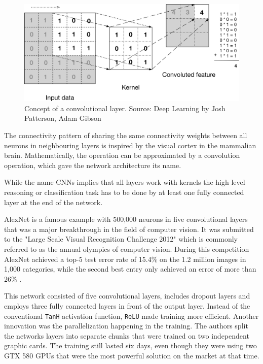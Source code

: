 \begin{figure}[h]
    \centering
	\includegraphics[width=.8\textwidth]{./images/illustrations/cnn}
    \caption{Concept of a convolutional layer. Source: Deep Learning by Josh Patterson, Adam Gibson}
    \label{fig:cnn}
\end{figure}





The connectivity pattern of sharing the same connectivity weights between all neurons in neighbouring layers is inspired by the visual cortex in the mammalian brain.
Mathematically, the operation can be approximated by a convolution operation, which gave the network architecture its name. 

While the name CNNs implies that all layers work with kernels the high level reasoning or classification task has to be done by at least one fully connected layer at the end of the network.

AlexNet is a famous example with 500,000 neurons in five convolutional layers \cite{AlexNet} that was a major breakthrough in the field of computer vision. It was submitted to the "Large Scale Visual Recognition Challenge 2012" which is commonly referred to as the annual olympics of computer vision.
During this competition AlexNet achieved a top-5 test error rate of 15.4\% on the 1.2 million images in 1,000 categories, while the second best entry only achieved an error of more than 26\% \cite{ILSVRC15}. 

This network consisted of five convolutional layers, includes dropout layers and employs three fully connected layers in front of the output layer. Instead of the conventional \texttt{TanH} activation function, \texttt{ReLU} made training more efficient.
Another innovation was the parallelization happening in the training. The authors split the networks layers into separate chunks that were trained on two independent graphic cards. The training still lasted six days, even though they were using two GTX 580 GPUs that were the most powerful solution on the market at that time.


